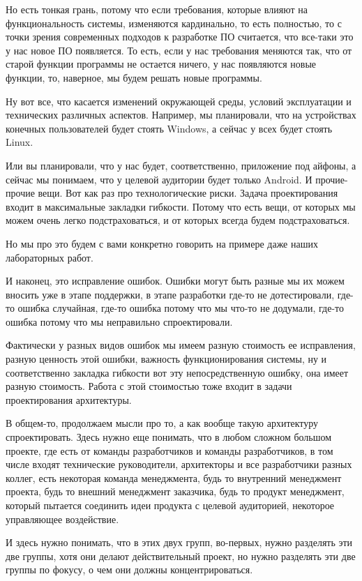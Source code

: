 Но есть тонкая грань, потому что если требования, которые влияют на функциональность системы, изменяются кардинально, то есть полностью, то с точки зрения современных подходов к разработке ПО считается, что все-таки это у нас новое ПО появляется. То есть, если у нас требования меняются так, что от старой функции программы не остается ничего, у нас появляются новые функции, то, наверное, мы будем решать новые программы.

Ну вот все, что касается изменений окружающей среды, условий эксплуатации и технических различных аспектов. Например, мы планировали, что на устройствах конечных пользователей будет стоять Windows, а сейчас у всех будет стоять Linux.

Или вы планировали, что у нас будет, соответственно, приложение под айфоны, а сейчас мы понимаем, что у целевой аудитории будет только Android. И прочие-прочие вещи. Вот как раз про технологические риски. Задача проектирования входит в максимальные закладки гибкости. Потому что есть вещи, от которых мы можем очень легко подстраховаться, и от которых всегда будем подстраховаться.

Но мы про это будем с вами конкретно говорить на примере даже наших лабораторных работ. 

И наконец, это исправление ошибок. Ошибки могут быть разные мы их можем вносить уже в этапе поддержки, в этапе разработки где-то не дотестировали, где-то ошибка случайная, где-то ошибка потому что мы что-то не додумали, где-то ошибка потому что мы неправильно спроектировали.

Фактически у разных видов ошибок мы имеем разную стоимость ее исправления, разную ценность этой ошибки, важность функционирования системы, ну и соответственно закладка гибкости вот эту непосредственную ошибку, она имеет разную стоимость. Работа с этой стоимостью тоже входит в задачи проектирования архитектуры.

В общем-то, продолжаем мысли про то, а как вообще такую архитектуру спроектировать. Здесь нужно еще понимать, что в любом сложном большом проекте, где есть от команды разработчиков и команды разработчиков, в том числе входят технические руководители, архитекторы и все разработчики разных коллег, есть некоторая команда менеджмента, будь то внутренний менеджмент проекта, будь то внешний менеджмент заказчика, будь то продукт менеджмент, который пытается соединить идеи продукта с целевой аудиторией, некоторое управляющее воздействие. 

И здесь нужно понимать, что в этих двух групп, во-первых, нужно разделять эти две группы, хотя они делают действительный проект, но нужно разделять эти две группы по фокусу, о чем они должны концентрироваться.

